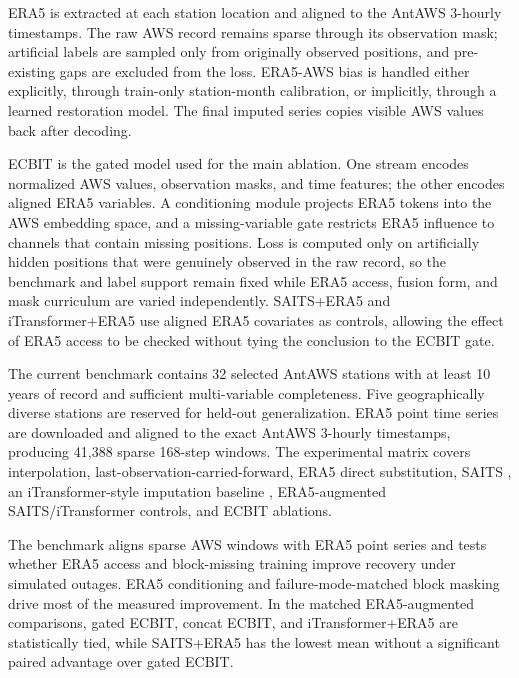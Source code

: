 ERA5 is extracted at each station location and aligned to the AntAWS 3-hourly timestamps. The raw AWS record remains sparse through its observation mask; artificial labels are sampled only from originally observed positions, and pre-existing gaps are excluded from the loss. ERA5-AWS bias is handled either explicitly, through train-only station-month calibration, or implicitly, through a learned restoration model. The final imputed series copies visible AWS values back after decoding.

ECBIT is the gated model used for the main ablation. One stream encodes normalized AWS values, observation masks, and time features; the other encodes aligned ERA5 variables. A conditioning module projects ERA5 tokens into the AWS embedding space, and a missing-variable gate restricts ERA5 influence to channels that contain missing positions. Loss is computed only on artificially hidden positions that were genuinely observed in the raw record, so the benchmark and label support remain fixed while ERA5 access, fusion form, and mask curriculum are varied independently. SAITS+ERA5 and iTransformer+ERA5 use aligned ERA5 covariates as controls, allowing the effect of ERA5 access to be checked without tying the conclusion to the ECBIT gate.

The current benchmark contains 32 selected AntAWS stations with at least 10 years of record and sufficient multi-variable completeness. Five geographically diverse stations are reserved for held-out generalization. ERA5 point time series are downloaded and aligned to the exact AntAWS 3-hourly timestamps, producing 41,388 sparse 168-step windows. The experimental matrix covers interpolation, last-observation-carried-forward, ERA5 direct substitution, SAITS \citep{du2023saits}, an iTransformer-style imputation baseline \citep{liu2024itransformer}, ERA5-augmented SAITS/iTransformer controls, and ECBIT ablations.

The benchmark aligns sparse AWS windows with ERA5 point series and tests whether ERA5 access and block-missing training improve recovery under simulated outages. ERA5 conditioning and failure-mode-matched block masking drive most of the measured improvement. In the matched ERA5-augmented comparisons, gated ECBIT, concat ECBIT, and iTransformer+ERA5 are statistically tied, while SAITS+ERA5 has the lowest mean without a significant paired advantage over gated ECBIT.

